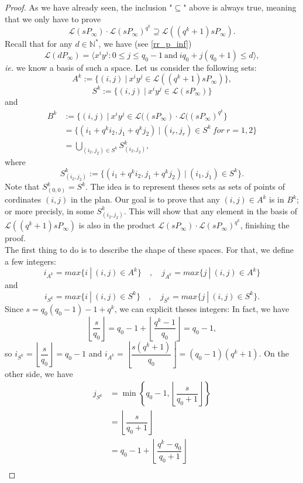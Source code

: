 \documentclass[a4paper]{article}
\newcommand{\calL}{\mathcal{L}}
\begin{document}
\begin{proof}
As we have already seen, the inclusion "$\subseteq$" above is always true, meaning that we only have to prove 
\[\calL(sP_{\infty}) \cdot \calL(sP_{\infty})^{q^k} \supseteq \calL((q^k+1)sP_{\infty}).\]
Recall that for any $d \in \mathbb{N}^*$, we have (see \eqref{rr_p_inf})
\[\calL(dP_{\infty}) = \langle x^iy^j : 0 \leq j \leq q_0-1 \ \mathrm{and} \ iq_0+j(q_0+1) \leq d \rangle, \]
\emph{ie.} we know a basis of such a space. Let us consider the following sets:
\[A^k := \{(i,j) \ | \ x^iy^j \in \calL((q^k+1)sP_{\infty})\},\]
\[S^k := \{(i,j) \ | \ x^iy^j \in \calL(sP_{\infty})\}\]
and
\begin{align*}
B^k &:= \{(i,j) \ | \ x^iy^j \in \calL((sP_{\infty}) \cdot \calL((sP_{\infty})^{q^k} \} \\
&= \{(i_1+q^ki_2,j_1+q^kj_2) \ | \ (i_r,j_r) \in S^k \ for \ r=1,2\} \\
&= \bigcup_{(i_2,j_2)\in S^k} S^k_{(i_2,j_2)},
\end{align*}
where 
\[ S^k_{(i_2,j_2)} := \{(i_1+q^ki_2,j_1+q^kj_2) \ | \ (i_1,j_1) \in S^k\}.\]
Note that $S^k_{(0,0)}=S^k$. The idea is to represent theses sets as sets of points of cordinates $(i,j)$ in the plan. Our goal is to prove that any $(i,j) \in A^k$ is in $B^k$; or more precisly, in some $S^k_{(i_2,j_2)}$. This will show that any element in the basis of $\calL((q^k+1)sP_{\infty})$ is also in the product $\calL(sP_{\infty}) \cdot \calL(sP_{\infty})^{q^k}$, finishing the proof. \\
The first thing to do is to describe the shape of these spaces. For that, we define a few integers:
\[i_{A^k} = max \{ i \ | \ (i,j) \in A^k\} \quad , \quad j_{A^k} = max \{ j \ | \ (i,j) \in A^k\}\]
and
\[i_{S^k} = max \{ i \ | \ (i,j) \in S^k\} \quad , \quad j_{S^k} = max \{ j \ | \ (i,j) \in S^k\}.\]
Since $s=q_0(q_0-1)-1+q^k$, we can explicit theses integers: In fact, we have 
\[ \left\lfloor \dfrac{s}{q_0} \right\rfloor = q_0-1 + \left\lfloor \dfrac{q^k-1}{q_0}\right\rfloor = q_0-1,\]
so $i_{S^k} = \left\lfloor \dfrac{s}{q_0} \right\rfloor = q_0-1$ and $i_{A^k} = \left\lfloor \dfrac{s(q^k+1)}{q_0} \right\rfloor = (q_0-1)(q^k+1)$. On the other side, we have 
\begin{align*}
    j_{S^k} &= \min \left\{ q_0-1, \left\lfloor \dfrac{s}{q_0+1} \right\rfloor \right\} \\
            &=  \left\lfloor \dfrac{s}{q_0+1} \right\rfloor \\
            &= q_0-1 +  \left\lfloor \dfrac{q^k-q_0}{q_0+1} \right\rfloor \\

\end{align*}
\end{proof}
\end{document}
